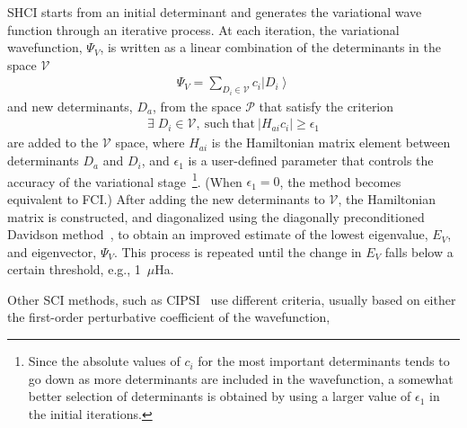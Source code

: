 \documentclass[%
reprint,
 superscriptaddress,
 amsmath,amssymb,
 aps,
]{revtex4-1}
\def\beq{\begin{eqnarray}}
\def\eeq{\end{eqnarray}}
\def\V{\mathcal{V}}
\def\P{\mathcal{P}}
\begin{document}
SHCI starts from an initial determinant
and generates the variational wave function through an iterative process.
At each iteration, the variational wavefunction, $\Psi_V$, is written as a linear combination of the determinants in the space $\V$
\begin{align}
\Psi_{V} = \sum_{D_i \in \V} c_{i} \left|D_{i}\right\rangle
\end{align}
and new determinants, ${D_a}$, from the space $\P$ that satisfy the criterion
\beq
\exists\; D_i \in \V , \mathrm{\ such\ that\ } \left|H_{a i} c_{i}\right| \ge \epsilon_{1}
\label{HCI_criterion}
\eeq
are added to the $\V$ space, where
$H_{ai}$ is the Hamiltonian matrix element between determinants $D_a$ and $D_i$, and
$\epsilon_1$ is a user-defined parameter that controls the accuracy of the variational
stage~\footnote{Since the absolute values of $c_i$ for the most important determinants tends to go down as more determinants are
included in the wavefunction, a somewhat better selection of determinants is obtained by using a larger value of
$\epsilon_1$ in the initial iterations.}.
(When $\epsilon_1=0$, the method becomes equivalent to FCI.)
After adding the new determinants to $\V$, the Hamiltonian matrix is constructed, and diagonalized using the diagonally
preconditioned Davidson method~\cite{Dav-CPC-89}, to obtain an improved estimate of the lowest eigenvalue, $E_{V}$, and eigenvector, $\Psi_V$.
This process is repeated until the change in $E_V$ falls below a certain threshold, e.g., 1~$\mu$Ha.

Other SCI methods, such as CIPSI~\cite{HurMalRan-JCP-73,EvaDauMal-CP-83} use different criteria, usually based on either the first-order perturbative
coefficient of the wavefunction,
\end{document}
